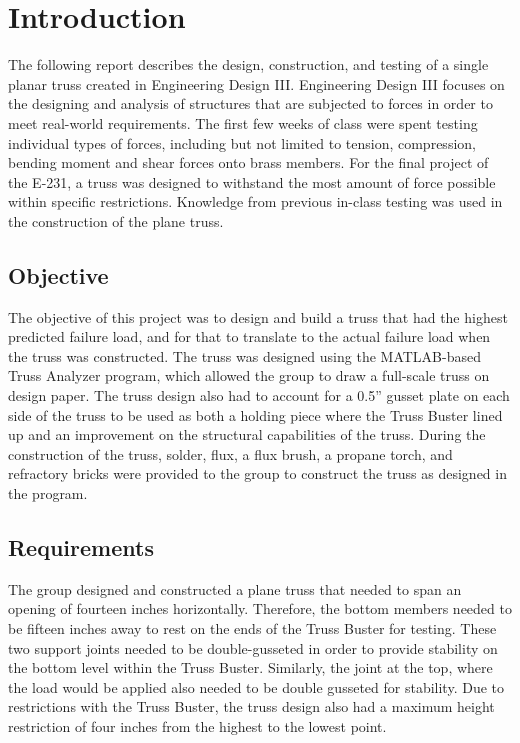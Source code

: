 \documentclass{article}
\begin{document}
\newpage
\tableofcontents
\newpage
{}


\section{Introduction}
The following report describes the design, construction, and testing of a single planar truss created in Engineering Design III. Engineering Design III focuses on the designing and analysis of structures that are subjected to forces in order to meet real-world requirements. The first few weeks of class were spent testing individual types of forces, including but not limited to tension, compression, bending moment and shear forces onto brass members. For the final project of the E-231, a truss was designed to withstand the most amount of force possible within specific restrictions. Knowledge from previous in-class testing was used in the construction of the plane truss. 


\subsection{Objective}
The objective of this project was to design and build a truss that had the highest predicted failure load, and for that to translate to the actual failure load when the truss was constructed. The truss was designed using the MATLAB-based Truss Analyzer program, which allowed the group to draw a full-scale truss on design paper. The truss design also had to account for a 0.5” gusset plate on each side of the truss to be used as both a holding piece where the Truss Buster lined up and an improvement on the structural capabilities of the truss. During the construction of the truss, solder, flux, a flux brush, a propane torch, and refractory bricks were provided to the group to construct the truss as designed in the program. 

\subsection{Requirements}
The group designed and constructed a plane truss that needed to span an opening of fourteen inches horizontally. Therefore, the bottom members needed to be fifteen inches away to rest on the ends of the Truss Buster for testing. These two support joints needed to be double-gusseted in order to provide stability on the bottom level within the Truss Buster. Similarly, the joint at the top, where the load would be applied also needed to be double gusseted for stability. Due to restrictions with the Truss Buster, the truss design also had a maximum height restriction of four inches from the highest to the lowest point. 
\end{document}
